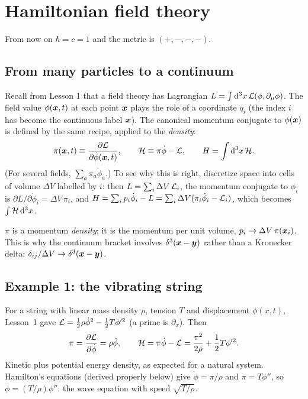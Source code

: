 \documentclass[11pt]{article}
\begin{document}
\section{Hamiltonian field theory}
\label{sec:fieldHam}

From now on $\hbar=c=1$ and the metric is $(+,-,-,-)$.

\subsection{From many particles to a continuum}

Recall from Lesson 1 that a field theory has Lagrangian $L=\int\mathrm{d}^3x\,\mathcal{L}(\phi,\partial_\mu\phi)$. The field value $\phi(\bm{x},t)$ at each point $\bm{x}$ plays the role of a coordinate $q_i$ (the index $i$ has become the continuous label $\bm{x}$). The canonical momentum conjugate to $\phi(\bm{x})$ is defined by the same recipe, applied to the \emph{density}:
\begin{equation}
 \pi(\bm{x},t)\equiv\frac{\partial \mathcal{L}}{\partial \dot\phi(\bm{x},t)},\qquad \mathcal{H}\equiv\pi\dot\phi-\mathcal{L},\qquad H=\int\mathrm{d}^3x\,\mathcal{H} .
\end{equation}
(For several fields, $\sum_a\pi_a\dot\phi_a$.) To see why this is right, discretize space into cells of volume $\Delta V$ labelled by $i$: then $L=\sum_i\Delta V\,\mathcal{L}_i$, the momentum conjugate to $\phi_i$ is $\partial L/\partial\dot\phi_i=\Delta V\,\pi_i$, and $H=\sum_i p_i\dot\phi_i-L=\sum_i\Delta V(\pi_i\dot\phi_i-\mathcal{L}_i)$, which becomes $\int\mathcal{H}\,\mathrm{d}^3x$.

\begin{pitfall}
$\pi$ is a momentum \emph{density}: it is the momentum per unit volume, $p_i\to\Delta V\,\pi(\bm{x}_i)$. This is why the continuum bracket involves $\delta^3(\bm{x}-\bm{y})$ rather than a Kronecker delta: $\delta_{ij}/\Delta V\to\delta^3(\bm{x}-\bm{y})$.
\end{pitfall}

\subsection{Example 1: the vibrating string}

For a string with linear mass density $\rho$, tension $T$ and displacement $\phi(x,t)$, Lesson~1 gave $\mathcal{L}=\tfrac12\rho\dot\phi^2-\tfrac12T\phi'^2$ (a prime is $\partial_x$). Then
\begin{equation}
 \pi=\frac{\partial \mathcal{L}}{\partial \dot\phi}=\rho\dot\phi,\qquad \mathcal{H}=\pi\dot\phi-\mathcal{L}=\frac{\pi^2}{2\rho}+\frac12T\phi'^2 .
\end{equation}
Kinetic plus potential energy density, as expected for a natural system. Hamilton's equations (derived properly below) give $\dot\phi=\pi/\rho$ and $\dot\pi=T\phi''$, so $\ddot\phi=(T/\rho)\phi''$: the wave equation with speed $\sqrt{T/\rho}$.
\end{document}
